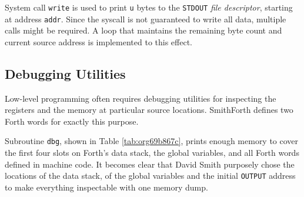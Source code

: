 \documentclass[a4paper,12pt,final]{article}
\begin{document}
System call \texttt{write} is used to print \texttt{u} bytes to the \texttt{STDOUT} \emph{file
descriptor}, starting at address \texttt{addr}.  Since the syscall is not
guaranteed to write all data, multiple calls might be required.  A
loop that maintains the remaining byte count and current source
address is implemented to this effect.
\clearpage


\subsection{Debugging Utilities}
\label{sec:org93c7bb6}

Low-level programming often requires debugging utilities for
inspecting the registers and the memory at particular source
locations.  SmithForth defines two Forth words for exactly this
purpose.

Subroutine \texttt{dbg}, shown in Table \ref{tab:org69b867c}, prints enough memory
to cover the first four slots on Forth's data stack, the global
variables, and all Forth words defined in machine code.  It becomes
clear that David Smith purposely chose the locations of the data
stack, of the global variables and the initial \texttt{OUTPUT} address to
make everything inspectable with one memory dump.
\end{document}
